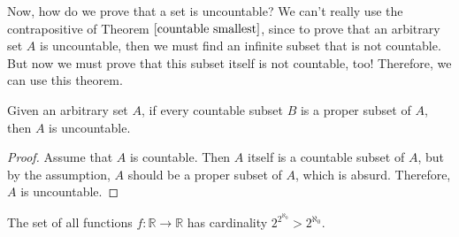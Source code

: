   Now, how do we prove that a set is uncountable? We can't really use the contrapositive of Theorem $\ref{countable smallest}$, since to prove that an arbitrary set $A$ is uncountable, then we must find an infinite subset that is not countable. But now we must prove that this subset itself is not countable, too! Therefore, we can use this theorem. 

  \begin{theorem}
    Given an arbitrary set $A$, if every countable subset $B$ is a proper subset of $A$, then $A$ is uncountable. 
  \end{theorem}
  \begin{proof}
    Assume that $A$ is countable. Then $A$ itself is a countable subset of $A$, but by the assumption, $A$ should be a proper subset of $A$, which is absurd. Therefore, $A$ is uncountable. 
  \end{proof}

  \begin{theorem}
    The set of all functions $f: \mathbb{R} \to \mathbb{R}$ has cardinality $2^{2^{\aleph_0}} > 2^{\aleph_0}$. 
  \end{theorem}
